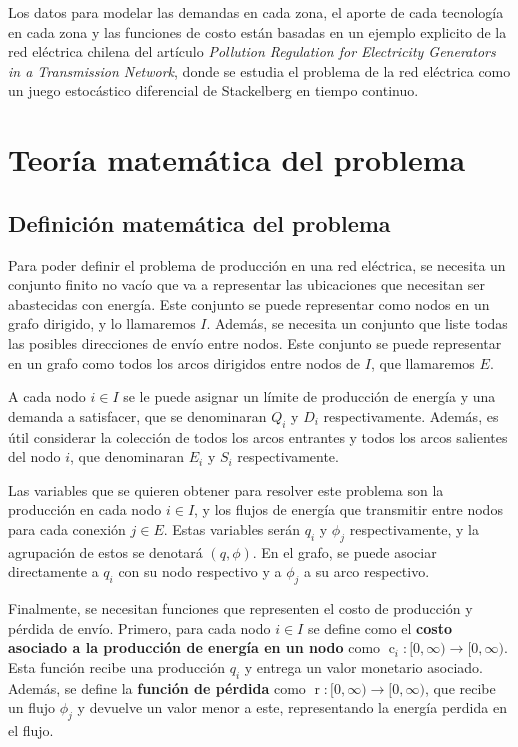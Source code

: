 \documentclass[12pt,twoside]{article}
\begin{document}
	Los datos para modelar las demandas en cada zona, el aporte de cada tecnolog\'ia en cada zona y las funciones de costo est\'an basadas en un ejemplo explicito de la red el\'ectrica chilena del art\'iculo \textit{Pollution Regulation for Electricity Generators in a Transmission Network}, donde se estudia el problema de la red el\'ectrica como un juego estoc\'astico diferencial de Stackelberg en tiempo continuo.

	\section{Teor\'ia matem\'atica del problema}
	\subsection{Definici\'on matem\'atica del problema}
	
	\hspace{1cm} Para poder definir el problema de producci\'on en una red el\'ectrica, se necesita un conjunto finito no vac\'io que va a representar las ubicaciones que necesitan ser abastecidas con energ\'ia. Este conjunto se puede representar como nodos en un grafo dirigido, y lo llamaremos \(I\). Adem\'as, se necesita un conjunto que liste todas las posibles direcciones de env\'io entre nodos. Este conjunto se puede representar en un grafo como todos los arcos dirigidos entre nodos de \(I\), que llamaremos \(E\).
	
	\hspace{1cm} A cada nodo \(i\in I\) se le puede asignar un l\'imite de producci\'on de energ\'ia y una demanda a satisfacer, que se denominaran \(Q_i\) y \(D_i\) respectivamente. Adem\'as, es \'util considerar la colecci\'on de todos los arcos entrantes y todos los arcos salientes del nodo \(i\), que denominaran \(E_i\) y \(S_i\) respectivamente.
	
	\hspace{1cm} Las variables que se quieren obtener para resolver este problema son la producci\'on en cada nodo \(i\in I\), y los flujos de energ\'ia que transmitir entre nodos para cada conexi\'on \(j\in E\). Estas variables ser\'an \(q_i\) y \(\phi_j\) respectivamente, y la agrupaci\'on de estos se denotar\'a \((q,\phi)\). En el grafo, se puede asociar directamente a \(q_i\) con su nodo respectivo y a \(\phi_j\) a su arco respectivo.
	
	\hspace{1cm} Finalmente, se necesitan funciones que representen el costo de producci\'on y p\'erdida de env\'io. Primero, para cada nodo \(i\in I\) se define como el \textbf{costo asociado a la producci\'on de energ\'ia en un nodo} como \(\operatorname{c}_i:[0,\infty)\to[0,\infty)\). Esta funci\'on recibe una producci\'on \(q_i\) y entrega un valor monetario asociado. Adem\'as, se define la \textbf{funci\'on de p\'erdida} como \(\operatorname{r}:[0,\infty)\to[0,\infty)\), que recibe un flujo \(\phi_j\) y devuelve un valor menor a este, representando la energ\'ia perdida en el flujo.
	
\end{document}

